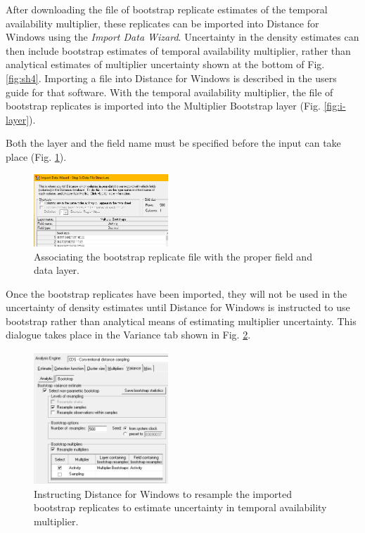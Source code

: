 \documentclass[a4paper, 10pt]{article}
\begin{document}
After downloading the file of bootstrap replicate estimates of the temporal availability multiplier, these replicates can be imported into Distance for Windows using the \emph{Import Data Wizard}.  Uncertainty in the density estimates can then include bootstrap estimates of temporal availability multiplier, rather than analytical estimates of multiplier uncertainty shown at the bottom of Fig. \ref{fig:sh4}.
\bigskip
Importing a file into Distance for Windows is described in the users guide for that software.  With the temporal availability multiplier, the file of bootstrap replicates is imported into the Multiplier Bootstrap layer (Fig. \ref{fig:i-layer}).

Both the layer and the field name must be specified before the input can take place (Fig. \ref{fig:i-file}).
\begin{figure}
\includegraphics[width=0.45\textwidth, frame]{images/import-filestructure.png}
\caption{Associating the bootstrap replicate file with the proper field and data layer. \label{fig:i-file}}
\vspace{-25pt}
\end{figure}



Once the bootstrap replicates have been imported, they will not be used in the uncertainty of density estimates until Distance for Windows is instructed to use bootstrap rather than analytical means of estimating multiplier uncertainty.  This dialogue takes place in the Variance tab shown in Fig. \ref{fig:i-boot}.

\begin{figure}
\includegraphics[width=0.45\textwidth, frame]{images/import-boot-activity.png}
\caption{Instructing Distance for Windows to resample the imported bootstrap replicates to estimate uncertainty in temporal availability multiplier. \label{fig:i-boot}}
\vspace{-25pt}
\end{figure}
\end{document}
